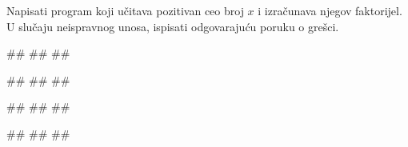 \begin{Exercise}[label=PET_05] 
 Napisati program koji učitava pozitivan ceo broj $x$ i izračunava njegov
 faktorijel. 
 U slučaju neispravnog unosa, ispisati odgovarajuću poruku o grešci. 

\begin{miditest}
\begin{upotreba}{1}
#\naslovInt#
##
##
\end{upotreba}
\end{miditest}
\begin{miditest}
\begin{upotreba}{2}
#\naslovInt#
##
##
\end{upotreba}
\end{miditest}

\begin{miditest}
\begin{upotreba}{3}
#\naslovInt#
##
##
\end{upotreba}
\end{miditest}
\begin{miditest}
\begin{upotreba}{4}
#\naslovInt#
##
##
\end{upotreba}
\end{miditest}

\end{Exercise}
\ifresenja
\begin{Answer}[ref=PET_05]
\end{Answer}
\fi


